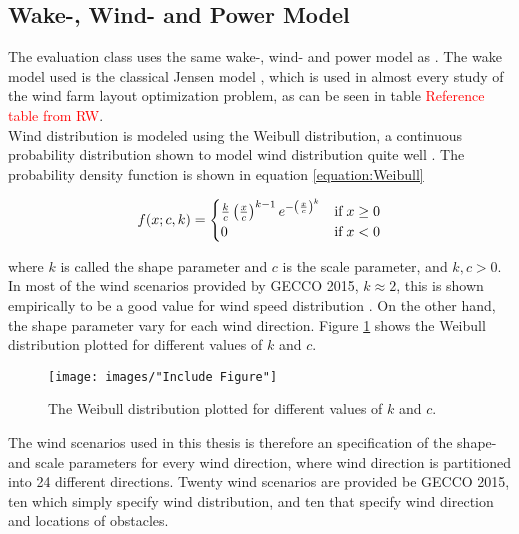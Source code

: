 \subsection{Wake-, Wind- and Power Model}
The evaluation class uses the same wake-, wind- and power model as \citep{Kusiak}. The wake model used is the classical Jensen model \citep{Jensen}, which is used in almost every study of the wind farm layout optimization problem, as can be seen in table \textcolor{red}{Reference table from RW}. \\

\noindent Wind distribution is modeled using the Weibull distribution, a continuous probability distribution shown to model wind distribution quite well \citep{Justus}. The probability density function is shown in equation \ref{equation:Weibull}


\begin{equation}
f(x; c, k)  = 
\begin{cases}
\frac{k}{c} \left( \frac{x}{c} \right)^{k-1} e^{- \left( \frac{x}{c} \right)^k } & \text{if} \hspace{1mm} x \geq 0 \\
0                                                                                                                      & \text{if} \hspace{1mm}     x < 0
\end{cases}
\label{equation:Weibull}
\end{equation}


\noindent where $k$ is called the shape parameter and $c$ is the scale parameter, and $k, c > 0$. In most of the wind scenarios provided by GECCO 2015, $k \approx 2$, this is shown empirically to be a good value for wind speed distribution \citep{Justus}. On the other hand, the shape parameter vary for each wind direction. Figure \ref{figure:weibull distribution} shows the Weibull distribution plotted for different values of $k$ and $c$. \\


\begin{figure}[h!]
\begin{center}
\texttt{[image: images/"Include Figure"]}
\caption{The Weibull distribution plotted for different values of $k$ and $c$.}
\label{figure:weibull distribution}
\end{center}
\end{figure}

\noindent The wind scenarios used in this thesis is therefore an specification of the shape- and scale parameters for every wind direction, where wind direction is partitioned into 24 different directions. Twenty wind scenarios are provided be GECCO 2015, ten which simply specify wind distribution, and ten that specify wind direction and locations of obstacles. \\

